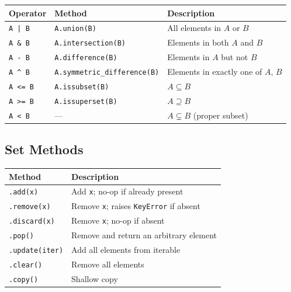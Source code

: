 \documentclass[oneside]{book}
\begin{document}
\begin{center}
\begin{tabularx}{\linewidth}{llX}
\toprule
\textbf{Operator} & \textbf{Method} & \textbf{Description} \\
\midrule
\texttt{A | B}    & \texttt{A.union(B)}                & All elements in $A$ or $B$ \\
\texttt{A \& B}   & \texttt{A.intersection(B)}         & Elements in both $A$ and $B$ \\
\texttt{A - B}    & \texttt{A.difference(B)}           & Elements in $A$ but not $B$ \\
\texttt{A \^{} B} & \texttt{A.symmetric\_difference(B)}& Elements in exactly one of $A$, $B$ \\
\texttt{A <= B}   & \texttt{A.issubset(B)}             & $A \subseteq B$ \\
\texttt{A >= B}   & \texttt{A.issuperset(B)}           & $A \supseteq B$ \\
\texttt{A < B}    & —                                  & $A \subsetneq B$ (proper subset) \\
\bottomrule
\end{tabularx}
\end{center}

\subsection*{Set Methods}

\begin{center}
\begin{tabularx}{\linewidth}{lX}
\toprule
\textbf{Method} & \textbf{Description} \\
\midrule
\texttt{.add(x)}          & Add \texttt{x}; no-op if already present \\
\texttt{.remove(x)}       & Remove \texttt{x}; raises \texttt{KeyError} if absent \\
\texttt{.discard(x)}      & Remove \texttt{x}; no-op if absent \\
\texttt{.pop()}           & Remove and return an arbitrary element \\
\texttt{.update(iter)}    & Add all elements from iterable \\
\texttt{.clear()}         & Remove all elements \\
\texttt{.copy()}          & Shallow copy \\
\bottomrule
\end{tabularx}
\end{center}
\end{document}
